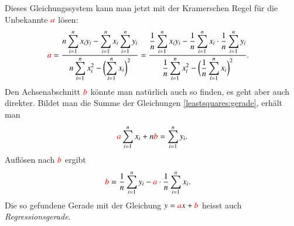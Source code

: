 Dieses Gleichungssystem kann man jetzt mit der Kramerschen Regel für die
Unbekannte ${\color{red}a}$ lösen:
\begin{align*}
{\color{red}a}
&=
\frac{\displaystyle
n\sum_{i=1}^n x_iy_i-\sum_{i=1}^nx_i\sum_{i=1}^ny_i
}{\displaystyle
n\sum_{i=1}^n x_i^2 -\biggl(\sum_{i=1}^n x_i\biggr)^2
}
=
\frac{\displaystyle
\frac1n\sum_{i=1}^n x_iy_i-\frac1n\sum_{i=1}^nx_i\cdot \frac1n\sum_{i=1}^ny_i
}{\displaystyle
\frac1n\sum_{i=1}^n x_i^2 -\biggl(\frac1n\sum_{i=1}^n x_i\biggr)^2
}.
\end{align*}
Den Achsenabschnitt $\color{red}b$ könnte man natürlich auch so finden,
es geht aber auch direkter.
Bildet man die Summe der Gleichungen 
\ref{leastsquares:gerade}, erhält man
\[
{\color{red}a}
\sum_{i=1}^n x_i
+
n{\color{red}b}
=
\sum_{i=1}^n y_i.
\]
Auflösen nach $\color{red}b$ ergibt
\begin{align*}
{\color{red}b}
&=
\frac1n\sum_{i=1}^n y_i
-{\color{red}a}
\cdot
\frac1n\sum_{i=1}^n x_i.
\end{align*}
Die so gefundene Gerade  mit der Gleichung
$y={\color{red}a}x+{\color{red}b}$
heisst auch {\em Regressionsgerade}.

